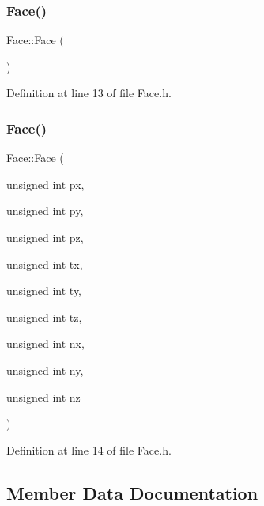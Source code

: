 \subsubsection{\texorpdfstring{Face()}{Face()}\hspace{0.1cm}{\footnotesize\ttfamily [1/2]}}
{\footnotesize\ttfamily Face\+::\+Face (\begin{DoxyParamCaption}{ }\end{DoxyParamCaption})\hspace{0.3cm}{\ttfamily [inline]}}



Definition at line 13 of file Face.\+h.

\mbox{\label{struct_face_acc432f36a78d2abdd6d7d7392299013c}} 
\subsubsection{\texorpdfstring{Face()}{Face()}\hspace{0.1cm}{\footnotesize\ttfamily [2/2]}}
{\footnotesize\ttfamily Face\+::\+Face (\begin{DoxyParamCaption}\item[{unsigned int}]{px,  }\item[{unsigned int}]{py,  }\item[{unsigned int}]{pz,  }\item[{unsigned int}]{tx,  }\item[{unsigned int}]{ty,  }\item[{unsigned int}]{tz,  }\item[{unsigned int}]{nx,  }\item[{unsigned int}]{ny,  }\item[{unsigned int}]{nz }\end{DoxyParamCaption})\hspace{0.3cm}{\ttfamily [inline]}}



Definition at line 14 of file Face.\+h.



\subsection{Member Data Documentation}
\mbox{\label{struct_face_a0d581c67d739a1372557e528b3dbb78a}} 
